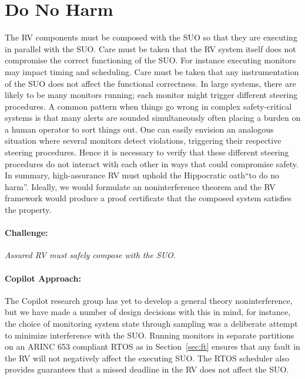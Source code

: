 \section{Do No Harm} \label{sec:noninter} The RV components must be
composed with the SUO so that they are executing in parallel with the
SUO.  Care must be taken that the RV system itself does not compromise
the correct functioning of the SUO.  For instance executing monitors
may impact timing and scheduling. Care must be taken that any
instrumentation of the SUO does not affect the functional
correctness. In large systems, there are likely to be many monitors
running; each monitor might trigger different steering procedures. A common
pattern when things go wrong in complex safety-critical systems is
that many alerts are sounded simultaneously often placing a burden on
a human operator to sort things out.  One can easily envision an
analogous situation where several monitors detect violations,
triggering their respective steering procedures. Hence it is necessary
to verify that these different steering procedures do not interact with
each other in ways that could compromise safety. In summary,
high-assurance RV must uphold the Hippocratic oath``to do no harm''.
Ideally, we would formulate an noninterference theorem and the RV
framework would produce a proof certificate that the composed system
satisfies the property.


\paragraph{Challenge:} \emph{Assured RV must safely compose with the
  SUO.}

\paragraph{Copilot Approach:}  
The Copilot research group has yet to develop a general theory
noninterference, but we have made a number of design decisions with
this in mind, for instance, the choice of monitoring system state
through sampling was a deliberate attempt to minimize interference
with the SUO. Running monitors in separate partitions on an ARINC 653
compliant RTOS as in Section~\ref{sec:ft} ensures that any fault
in the RV will not negatively affect the executing SUO. The RTOS
scheduler also provides guarantees that a missed deadline in the RV
does not affect the SUO.

 

